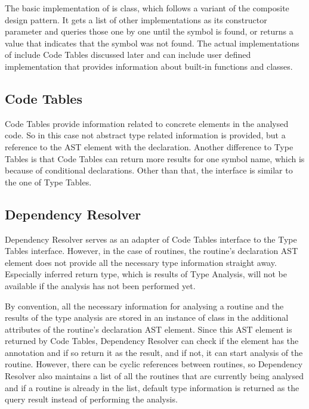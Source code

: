         The basic implementation of  is 
         class, which follows a variant of the 
        composite design pattern. It gets a list of other 
         implementations as its constructor 
        parameter and queries those one by one until the 
        symbol is found, or returns a value that indicates 
        that the symbol was not found. The actual implementations 
        of  include Code Tables discussed 
        later and can include user defined  
        implementation that provides information about 
        built-in functions and classes.
    
        \subsection{Code Tables}
        Code Tables provide information related to concrete elements in 
        the analysed code. So in this case not abstract type related 
        information is provided, but a reference to the AST element 
        with the declaration. Another difference to Type Tables is that 
        Code Tables can return more results for one symbol name, 
        which is because of conditional declarations. 
        Other than that, the interface is similar to the one of 
        Type Tables.
        
        \subsection{Dependency Resolver}
        Dependency Resolver serves as an adapter of Code Tables interface 
        to the Type Tables interface. However, in the case of routines, 
        the routine's declaration AST element does not provide all the 
        necessary type information straight away. Especially inferred 
        return type, which is results of Type Analysis, will not be 
        available if the analysis has not been performed yet.
        
        By convention, all the necessary information for analysing a 
        routine and the results of the type analysis are stored in an 
        instance of  class in the additional attributes 
        of the routine's declaration AST element. Since this AST element 
        is returned by Code Tables, Dependency Resolver can check if 
        the element has the annotation and if so return it as the result, 
        and if not, it can start analysis of the routine. However, 
        there can be cyclic references between routines, so Dependency 
        Resolver also maintains a list of all the routines that are 
        currently being analysed and if a routine is already in the list, 
        default type information is returned as the query result instead 
        of performing the analysis.
        
